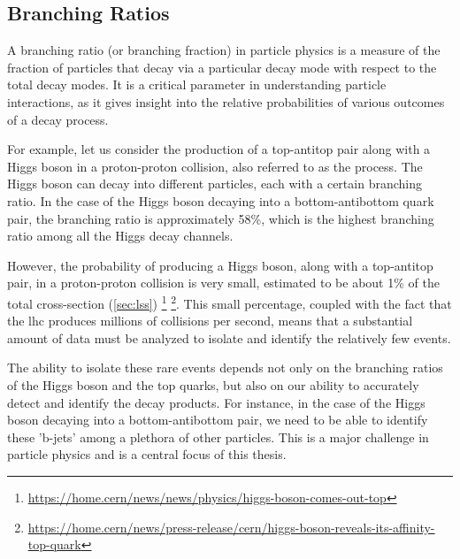 \subsection{Branching Ratios}

A branching ratio (or branching fraction) in particle physics is a measure of the fraction of particles that decay via a
particular decay mode with respect to the total decay modes. It is a critical parameter in understanding particle
interactions, as it gives insight into the relative probabilities of various outcomes of a decay process.

For example, let us consider the production of a top-antitop pair along with a Higgs boson in a proton-proton collision,
also referred to as the \tth process. The Higgs boson can decay into different particles, each with a certain branching
ratio. In the case of the Higgs boson decaying into a bottom-antibottom quark pair, the branching ratio is approximately
58\%, which is the highest branching ratio among all the Higgs decay channels.

However, the probability of producing a Higgs boson, along with a top-antitop pair, in a proton-proton collision is very
small, estimated to be about 1\% of the total cross-section (\autoref{sec:lss})
\footnote{\url{https://home.cern/news/news/physics/higgs-boson-comes-out-top}}
\footnote{\url{https://home.cern/news/press-release/cern/higgs-boson-reveals-its-affinity-top-quark}}. This small
percentage, coupled with the fact that the \gls{lhc} produces millions of collisions per second, means that a
substantial amount of data must be
analyzed to isolate and identify the relatively few \tth events.

The ability to isolate these rare events depends not only on the branching ratios of the Higgs boson and the top quarks,
but also on our ability to accurately detect and identify the decay products. For instance, in the case of the Higgs
boson decaying into a bottom-antibottom pair, we need to be able to identify these 'b-jets' among a plethora of other
particles. This is a major challenge in particle physics and is a central focus of this thesis.